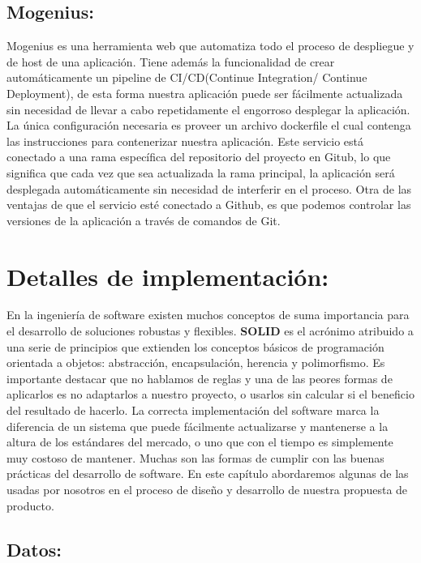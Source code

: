 \subsection{Mogenius:}

Mogenius es una herramienta web que automatiza todo el proceso de despliegue y de host de una aplicación. Tiene además la funcionalidad de crear automáticamente un pipeline de CI/CD(Continue Integration/ Continue Deployment), de esta forma nuestra aplicación puede ser fácilmente actualizada sin necesidad de llevar a cabo repetidamente el engorroso desplegar la aplicación. La única configuración necesaria es proveer un archivo dockerfile el cual contenga las instrucciones para contenerizar nuestra aplicación. Este servicio está conectado a una rama específica del repositorio del proyecto en Gitub, lo que significa que cada vez que sea actualizada la rama principal, la aplicación será desplegada automáticamente sin necesidad de interferir en el proceso. Otra de las ventajas de que el servicio esté conectado a Github, es que podemos controlar las versiones de la aplicación a través de comandos de Git.


\section{Detalles de implementación:}

En la ingeniería de software existen muchos conceptos de suma importancia para el desarrollo de soluciones robustas y flexibles. \textbf{SOLID} es el acrónimo atribuido a una serie de principios que extienden los conceptos básicos de programación orientada a objetos: abstracción, encapsulación, herencia y polimorfismo. Es importante destacar que no hablamos de reglas y una de las peores formas de aplicarlos es no adaptarlos a nuestro proyecto, o usarlos sin calcular si el beneficio del resultado de hacerlo. La correcta implementación del software marca la diferencia de un sistema que puede fácilmente actualizarse y mantenerse a la altura de los estándares del mercado, o uno que con el tiempo es simplemente muy costoso de mantener. Muchas son las formas de cumplir con las buenas prácticas del desarrollo de software. En este capítulo abordaremos algunas de las usadas por nosotros en el proceso de diseño y desarrollo de nuestra propuesta de producto.

\subsection{Datos:}

